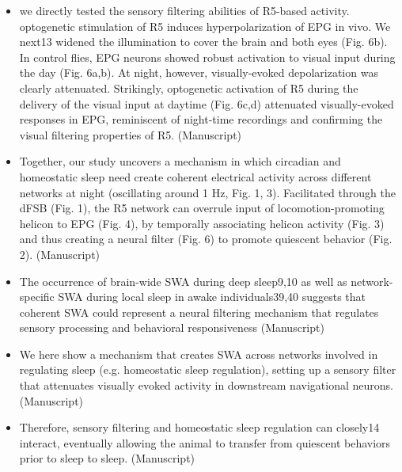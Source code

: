 \documentclass[11pt]{article}
\begin{document}
\begin{itemize}
    \item we directly tested the sensory filtering abilities of R5-based activity. optogenetic stimulation of
    R5 induces hyperpolarization of EPG in vivo. We next13
    widened the illumination to cover the brain and both eyes (Fig. 6b). In control flies, EPG
    neurons showed robust activation to visual input during the day (Fig. 6a,b). At night, however,
    visually-evoked depolarization was clearly attenuated. Strikingly, optogenetic activation of R5
    during the delivery of the visual input at daytime (Fig. 6c,d) attenuated visually-evoked
    responses in EPG, reminiscent of night-time recordings and confirming the visual filtering
    properties of R5.
    \parencite{raccugliaCoherentMultilevelNetwork2022} (Manuscript)

    \item Together, our study uncovers a mechanism in which circadian and homeostatic sleep need
    create coherent electrical activity across different networks at night (oscillating around 1 Hz,
    Fig. 1, 3). Facilitated through the dFSB (Fig. 1), the R5 network can overrule input of
    locomotion-promoting helicon to EPG (Fig. 4), by temporally associating helicon activity (Fig.
    3) and thus creating a neural filter (Fig. 6) to promote quiescent behavior (Fig. 2).
    \parencite{raccugliaCoherentMultilevelNetwork2022} (Manuscript)

    \item The occurrence of brain-wide SWA during deep sleep9,10 as well as network-specific SWA
    during local sleep in awake individuals39,40 suggests that coherent SWA could represent a
    neural filtering mechanism that regulates sensory processing and behavioral
    responsiveness
    \parencite{raccugliaCoherentMultilevelNetwork2022} (Manuscript)

    \item We here show
    a mechanism that creates SWA across networks involved in regulating sleep (e.g. homeostatic
    sleep regulation), setting up a sensory filter that attenuates visually evoked activity in
    downstream navigational neurons.
    \parencite{raccugliaCoherentMultilevelNetwork2022} (Manuscript)

    \item Therefore, sensory filtering and homeostatic sleep regulation can closely14
    interact, eventually allowing the animal to transfer from quiescent behaviors prior to sleep to
    sleep.
    \parencite{raccugliaCoherentMultilevelNetwork2022} (Manuscript)


\end{itemize}
\end{document}
